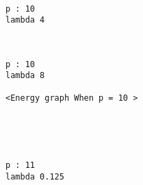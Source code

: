 \documentclass[11pt]{article}
\begin{document}
    \begin{center}
    \end{center}
    { \hspace*{\fill} \\}
    
    \begin{Verbatim}[commandchars=\\\{\}]
p : 10
lambda 4

    \end{Verbatim}

    \begin{center}
    \end{center}
    { \hspace*{\fill} \\}
    
    \begin{Verbatim}[commandchars=\\\{\}]
p : 10
lambda 8

<Energy graph When p = 10 >

    \end{Verbatim}

    \begin{center}
    \end{center}
    { \hspace*{\fill} \\}
    
    \begin{center}
    \end{center}
    { \hspace*{\fill} \\}
    
    \begin{Verbatim}[commandchars=\\\{\}]
p : 11
lambda 0.125

    \end{Verbatim}

    \begin{center}
    \end{center}
    { \hspace*{\fill} \\}
    
\end{document}

